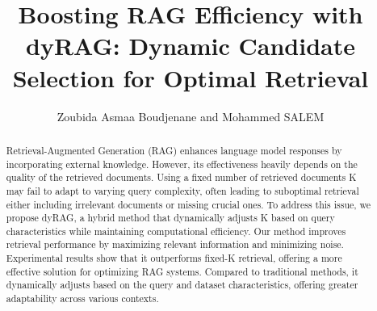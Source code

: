 \documentclass[Afour,sageh,times]{sagej}
\begin{document}

\title{Boosting RAG Efficiency with dyRAG: Dynamic Candidate Selection for Optimal Retrieval}

\author{Zoubida Asmaa Boudjenane  and Mohammed SALEM }




\begin{abstract}
Retrieval-Augmented Generation (RAG) enhances language model responses by incorporating external knowledge. However, its effectiveness heavily depends on the quality of the retrieved documents. Using a fixed number of retrieved documents K may fail  to adapt to varying query complexity, often leading to suboptimal retrieval either including irrelevant documents or missing crucial ones. To address this issue, we propose dyRAG, a hybrid method that dynamically adjusts K based on query characteristics while maintaining computational efficiency. Our method improves retrieval performance by maximizing relevant information and minimizing noise. Experimental results show that it outperforms fixed-K retrieval, offering a more effective solution for optimizing RAG systems. Compared to traditional methods, it dynamically adjusts based on the query and dataset characteristics, offering greater adaptability across various contexts.
\end{abstract}


\maketitle
\end{document}
